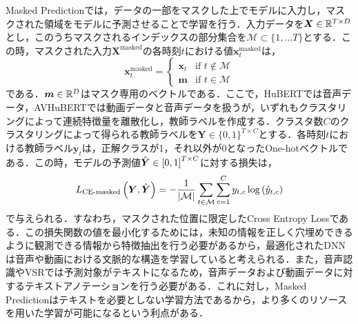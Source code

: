 Masked Predictionでは，データの一部をマスクした上でモデルに入力し，マスクされた領域をモデルに予測させることで学習を行う．入力データを$\bm{X} \in \mathbb{R}^{T \times D}$とし，このうちマスクされるインデックスの部分集合を$\mathcal{M} \subset \{ 1, \ldots T \}$とする．この時，マスクされた入力$\bm{X}^{\text{masked}}$の各時刻$t$における値$\bm{x}^{\text{masked}}_{t}$は，
\begin{equation}
    \bm{x}^{\text{masked}}_{t} =
    \begin{cases}
        \bm{x}_{t} & \text{if $t \notin \mathcal{M}$} \\
        \bm{m}     & \text{if $t \in \mathcal{M}$}
    \end{cases}
\end{equation}
である．$\bm{m} \in \mathbb{R}^{D}$はマスク専用のベクトルである．ここで，HuBERTでは音声データ，AVHuBERTでは動画データと音声データを扱うが，いずれもクラスタリングによって連続特徴量を離散化し，教師ラベルを作成する．クラスタ数$C$のクラスタリングによって得られる教師ラベルを$\bm{Y} \in \{0, 1\}^{T \times C}$とする．各時刻$t$における教師ラベル$\bm{y}_{t}$は，正解クラスが1，それ以外が0となったOne-hotベクトルである．この時，モデルの予測値$\hat{\bm{Y}} \in \left[0, 1\right]^{T \times C}$に対する損失は，
\begin{equation}
    L_{\text{CE-masked}}\left(\bm{Y}, \hat{\bm{Y}}\right) =
    - \frac{1}{|\mathcal{M}|} \sum_{t \in \mathcal{M}} \sum_{c = 1}^{C} y_{t, c} \log \left(\hat{y}_{t, c}\right)
\end{equation}
で与えられる．すなわち，マスクされた位置に限定したCross Entropy Lossである．この損失関数の値を最小化するためには，未知の情報を正しく穴埋めできるように観測できる情報から特徴抽出を行う必要があるから，最適化されたDNNは音声や動画における文脈的な構造を学習していると考えられる．また，音声認識やVSRでは予測対象がテキストになるため，音声データおよび動画データに対するテキストアノテーションを行う必要がある．これに対し，Masked Predictionはテキストを必要としない学習方法であるから，より多くのリソースを用いた学習が可能になるという利点がある．